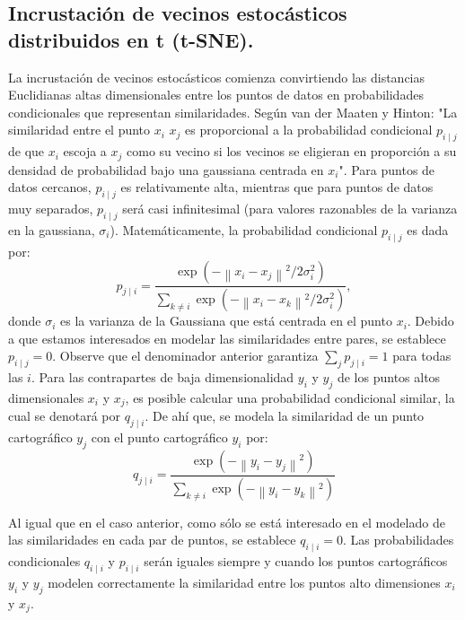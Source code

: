 \documentclass[12pt,letterpaper,oneside,openright]{book}
\begin{document}
\subsection{Incrustación de vecinos estocásticos distribuidos en t (t-SNE).}
	\label{subsec:tsne}
	 La incrustación de vecinos estocásticos comienza convirtiendo las distancias Euclidianas altas dimensionales entre los puntos de datos en probabilidades condicionales que representan similaridades. Según van der Maaten y Hinton: "La similaridad entre el punto $x_i$ $x_j$ es proporcional a la probabilidad condicional $p_{i\mid j}$ de que $x_i$ escoja a $x_j$ como su vecino si los vecinos se eligieran en proporción a su densidad de probabilidad bajo una gaussiana centrada en $x_i$". Para puntos de datos cercanos, $p_{i\mid j}$ es relativamente alta, mientras que para puntos de datos muy separados, $p_{i\mid j}$ será casi infinitesimal (para valores razonables de la varianza en la gaussiana, $\sigma_i$). Matemáticamente, la probabilidad condicional $p_{i\mid j}$ es dada por: 
	 \begin{equation}
	 	\label{eq:prob_cond}
	 	p_{j \mid i}=\frac{\exp \left(-\left\|x_i-x_j\right\|^2 / 2 \sigma_i^2\right)}{\sum_{k \neq i} \exp \left(-\left\|x_i-x_k\right\|^2 / 2 \sigma_i^2\right)},
	 \end{equation}
	donde $\sigma_i$ es la varianza de la Gaussiana que está centrada en el punto $x_i$. Debido a que estamos interesados en modelar las similaridades entre pares, se establece $p_{i\mid j} = 0$. Observe que el denominador anterior garantiza $\sum_j p_{j \mid i}=1$ para todas las $i$. Para las contrapartes de baja dimensionalidad $y_i$ y $y_j$ de los puntos altos dimensionales $x_i$ y $x_j$, es posible calcular una probabilidad condicional similar, la cual se denotará por $q_{j \mid i}$. De ahí que, se modela la similaridad de un punto cartográfico $y_j$ con el punto cartográfico $y_i$ por:
	\begin{equation}
		\label{eq:prob_cond_q}
		q_{j \mid i}=\frac{\exp \left(-\left\|y_i-y_j\right\|^2\right)}{\sum_{k \neq i} \exp \left(-\left\|y_i-y_k\right\|^2\right)}
	\end{equation}
	
	Al igual que en el caso anterior, como sólo se está interesado en el modelado de las similaridades en cada par de puntos, se establece $q_{i \mid i}=0$.
	Las probabilidades condicionales $q_{i \mid i}$ y $p_{i \mid i}$ serán iguales siempre y cuando los puntos cartográficos $y_i$ y $y_j$ modelen correctamente la similaridad entre los puntos alto dimensiones $x_i$ y $x_j$.
	
\end{document}
